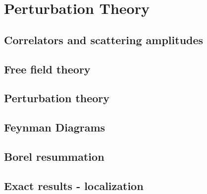 \documentclass[../main/main.tex]{subfiles}
\begin{document}
\chapter{Perturbation Theory}

\section{Correlators and scattering amplitudes}
























\section{Free field theory}
\section{Perturbation theory}
\section{Feynman Diagrams}
\section{Borel resummation}
\section{Exact results - localization}
\end{document}
